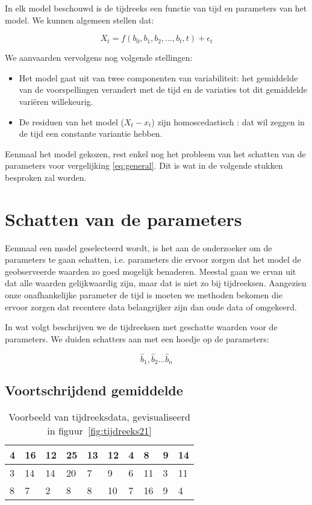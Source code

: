 In elk model beschouwd is de tijdreeks een functie van tijd en parameters van het model. We kunnen algemeen stellen dat:

\begin{equation}
	X_{t} = f(b_{0}, b_{1}, b_{2}, \dots , b_{t}, t) + \epsilon_{t}
\label{eq:general}
\end{equation}

We aanvaarden vervolgens nog volgende stellingen:

\begin{itemize}
	\item Het model gaat uit van twee componenten van variabiliteit: het gemiddelde van de voorspellingen verandert met de tijd en de variaties tot dit gemiddelde variëren willekeurig.
	\item De residuen van het model ($X_{t} - x_{t}$) zijn homoscedastisch : dat wil zeggen in de tijd een constante variantie hebben.
\end{itemize}

Eenmaal het model gekozen, rest enkel nog het  probleem van het schatten van de parameters voor vergelijking \ref{eq:general}. Dit is wat in de volgende stukken besproken zal worden.

\section{Schatten van de parameters}

Eenmaal een model geselecteerd wordt, is het aan de onderzoeker om de parameters te gaan schatten, i.e. parameters die ervoor zorgen dat het model de geobserveerde waarden zo goed mogelijk benaderen. Meestal gaan we ervan uit dat alle waarden gelijkwaardig zijn, maar dat is niet zo bij tijdreeksen. Aangezien onze onafhankelijke parameter de tijd is moeten we methoden bekomen die ervoor zorgen dat recentere data belangrijker zijn dan oude data of omgekeerd. 

In wat volgt beschrijven we de tijdreeksen met geschatte waarden voor de parameters. We duiden schatters aan met een hoedje op de parameters:

\[ \widehat{b}_{1}, \widehat{b}_{2} \dots \widehat{b}_{n} \] 

\subsection{Voortschrijdend gemiddelde}

\begin{table}
\centering
\begin{tabular}{|l|l|l|l|l|l|l|l|l|l|}
  \hline
  4 & 16 & 12 & 25 & 13 & 12 & 4 & 8  & 9 & 14 \\ \hline
  3 & 14 & 14 & 20 & 7  & 9  & 6 & 11 & 3 & 11 \\ \hline
  8 & 7  & 2  & 8  & 8  & 10 & 7 & 16 & 9 & 4  \\ \hline
\end{tabular}
\caption{Voorbeeld van tijdreeksdata, gevisualiseerd in figuur~\ref{fig:tijdreeks21}}
\label{tab:data-tijdreeks21}
\end{table}

